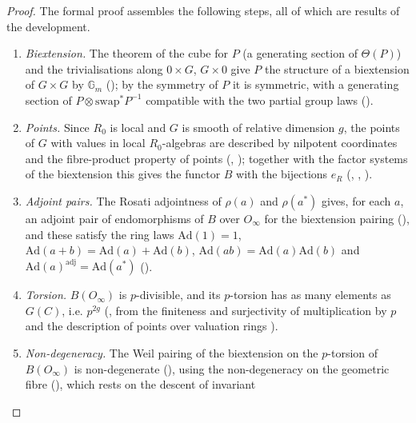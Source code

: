 \begin{proof}
The formal proof assembles the following steps, all of which are results of the development.
\begin{enumerate}[label=(\arabic*)]
\item \emph{Biextension.} The theorem of the cube for $P$ (a generating section of $\Theta(P)$) and the trivialisations
along $0\times G$, $G\times0$ give $P$ the structure of a biextension of $G\times G$ by $\mathbb G_m$
(); by the symmetry of $P$ it is symmetric, with a generating
section of $P\otimes\mathrm{swap}^*P^{-1}$ compatible with the two partial group laws
().
\item \emph{Points.} Since $R_0$ is local and $G$ is smooth of relative dimension $g$, the points of $G$ with values in
local $R_0$-algebras are described by nilpotent coordinates and the fibre-product property of points
(, ); together with
the factor systems of the biextension this gives the functor $B$ with the bijections $e_R$
(, ,
).
\item \emph{Adjoint pairs.} The Rosati adjointness of $\rho(a)$ and $\rho(a^*)$ gives, for each $a$, an adjoint pair of
endomorphisms of $B$ over $O_\infty$ for the biextension pairing (),
and these satisfy the ring laws $\mathrm{Ad}(1)=1$, $\mathrm{Ad}(a+b)=\mathrm{Ad}(a)+\mathrm{Ad}(b)$,
$\mathrm{Ad}(ab)=\mathrm{Ad}(a)\mathrm{Ad}(b)$ and $\mathrm{Ad}(a)^{\mathrm{adj}}=\mathrm{Ad}(a^*)$
().
\item \emph{Torsion.} $B(O_\infty)$ is $p$-divisible, and its $p$-torsion has as many elements as $G(C)$, i.e.
$p^{2g}$ (, from the finiteness and surjectivity of
multiplication by $p$ and the description of points over valuation rings
).
\item \emph{Non-degeneracy.} The Weil pairing of the biextension on the $p$-torsion of $B(O_\infty)$ is non-degenerate
(), using the non-degeneracy on the geometric fibre
(), which rests on the descent of invariant

\end{enumerate}
\end{proof}
